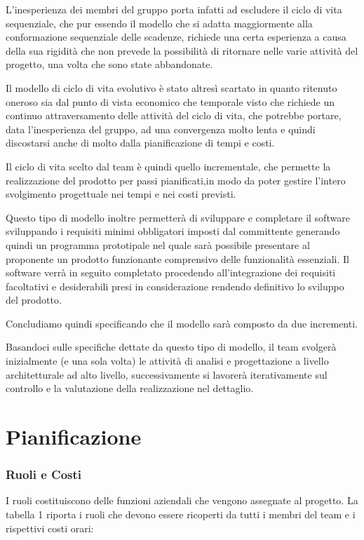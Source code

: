 L'inesperienza dei membri del gruppo porta infatti ad escludere il ciclo di vita sequenziale, che pur essendo il modello che si adatta maggiormente alla conformazione sequenziale delle scadenze, richiede una certa esperienza a causa della sua rigidità che non prevede la possibilità di ritornare nelle varie attività del progetto, una volta che sono state abbandonate.

Il modello di ciclo di vita evolutivo è stato altresì scartato in quanto ritenuto oneroso sia dal punto di vista economico che temporale visto che richiede un continuo attraversamento delle attività del ciclo di vita, che potrebbe portare, data l'inesperienza del gruppo, ad una convergenza molto lenta e quindi discostarsi anche di molto dalla pianificazione di tempi e costi.

Il ciclo di vita scelto dal team è quindi quello incrementale, che permette la realizzazione del prodotto per passi pianificati,in modo da poter gestire l'intero svolgimento progettuale nei tempi e nei costi previsti.

Questo tipo di modello inoltre permetterà di sviluppare e completare il software sviluppando i requisiti minimi obbligatori imposti dal committente generando quindi un programma prototipale nel quale sarà possibile presentare al proponente un prodotto funzionante comprensivo delle funzionalità essenziali. Il software verrà in seguito completato procedendo all'integrazione dei requisiti facoltativi e desiderabili presi in considerazione rendendo definitivo lo sviluppo del prodotto.

Concludiamo quindi specificando che il modello sarà composto da due incrementi.

Basandoci sulle specifiche dettate da questo tipo di modello, il team svolgerà inizialmente (e una sola volta) le attività di analisi e progettazione a livello architetturale ad alto livello, successivamente si lavorerà iterativamente sul controllo e la valutazione della realizzazione nel dettaglio.
\clearpage

\section{Pianificazione}

\subsubsection{Ruoli e Costi}
I ruoli costituiscono delle funzioni aziendali che vengono assegnate al progetto. La tabella 1 riporta i ruoli che devono essere ricoperti da tutti i membri del team e i rispettivi costi orari:

